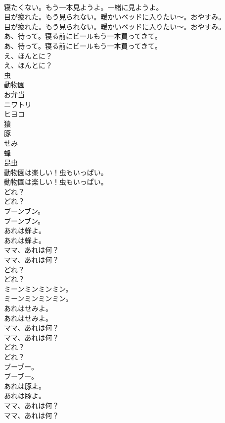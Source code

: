 \documentclass[8pt]{extreport}
\begin{document}
\begin{CJK}{UTF8}{min}
\\	寝たくない。もう一本見ようよ。一緒に見ようよ。 
\\	目が疲れた。もう見られない。暖かいベッドに入りたい〜。おやすみ。	
\\	目が疲れた。もう見られない。暖かいベッドに入りたい〜。おやすみ。 
\\	あ、待って。寝る前にビールもう一本買ってきて。	
\\	あ、待って。寝る前にビールもう一本買ってきて。 
\\	え、ほんとに？	
\\	え、ほんとに？ 
\\	虫
\\	動物園
\\	お弁当
\\	ニワトリ
\\	ヒヨコ
\\	猿
\\	豚
\\	せみ
\\	蜂
\\	昆虫
\\	動物園は楽しい！虫もいっぱい。	
\\	動物園は楽しい！虫もいっぱい。 
\\	どれ？	
\\	どれ？ 
\\	ブーンブン。	
\\	ブーンブン。 
\\	あれは蜂よ。	
\\	あれは蜂よ。 
\\	ママ、あれは何？	
\\	ママ、あれは何？ 
\\	どれ？	
\\	どれ？ 
\\	ミーンミンミンミン。	
\\	ミーンミンミンミン。 
\\	あれはせみよ。	
\\	あれはせみよ。 
\\	ママ、あれは何？	
\\	ママ、あれは何？ 
\\	どれ？	
\\	どれ？ 
\\	ブーブー。	
\\	ブーブー。 
\\	あれは豚よ。	
\\	あれは豚よ。 
\\	ママ、あれは何？	
\\	ママ、あれは何？ 

\end{CJK}
\end{document}
